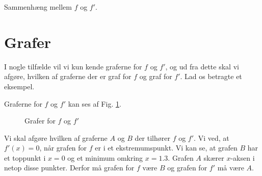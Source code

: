 \begin{center}
\Huge
Sammenhæng mellem $f$ og $f'$.
\end{center}

\section*{Grafer}

I nogle tilfælde vil vi kun kende graferne for $f$ og $f'$, og ud fra dette skal vi afgøre, hvilken af graferne der er graf for $f$ og graf for $f'$. Lad os betragte et eksempel.
\begin{exa}
	Graferne for $f$ og $f'$ kan ses af Fig. \ref{fig:grafer}.
	\begin{figure}[H]
		\centering
		\caption{Grafer for $f$ og $f'$}
		\label{fig:grafer}
	\end{figure}
	Vi skal afgøre hvilken af graferne $A$ og $B$ der tilhører $f$ og $f'$. Vi ved, at $f'(x) = 0$, når grafen for $f$ er i et ekstremumspunkt. Vi kan se, at grafen $B$ har et toppunkt i $x=0$ og et 
	minimum omkring $x=1.3$. Grafen $A$ skærer $x$-aksen i netop disse punkter. Derfor må grafen for $f$ være $B$ og grafen for $f'$ må være $A$. 
\end{exa}

